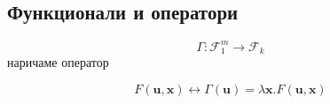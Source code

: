 \subsection{Функционали и оператори}
\begin{definition}
    \begin{equation*}
        \Gamma : \mathcal F_1^m \to \mathcal F_k
    \end{equation*}
    наричаме оператор
\end{definition}
\begin{corollary}[Съответсвие]
    \begin{equation*}
        F(\textbf{u}, \textbf{x}) \longleftrightarrow \Gamma(\textbf{u}) = \lambda \textbf{x}. F(\textbf{u}, \textbf{x})
    \end{equation*}
\end{corollary}


